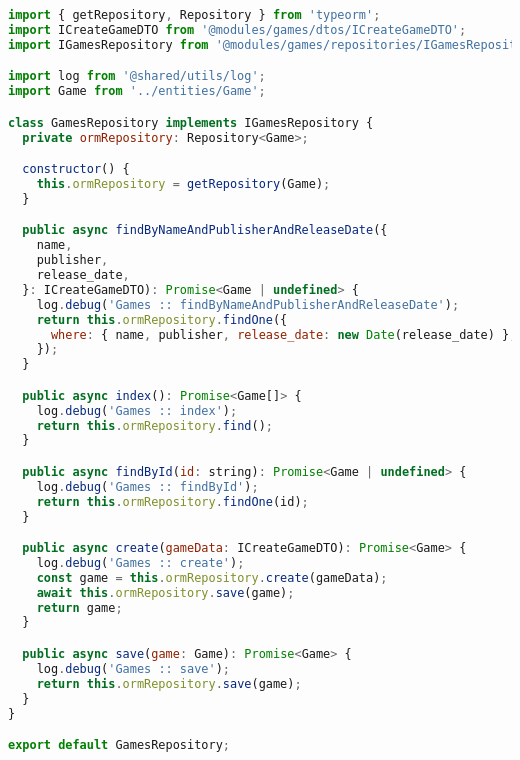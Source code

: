 \begin{lstlisting}[language=JavaScript, caption={GamesRepository.ts},captionpos=b, label=alg:gamerepository]
import { getRepository, Repository } from 'typeorm';
import ICreateGameDTO from '@modules/games/dtos/ICreateGameDTO';
import IGamesRepository from '@modules/games/repositories/IGamesRepository';

import log from '@shared/utils/log';
import Game from '../entities/Game';

class GamesRepository implements IGamesRepository {
  private ormRepository: Repository<Game>;

  constructor() {
    this.ormRepository = getRepository(Game);
  }

  public async findByNameAndPublisherAndReleaseDate({
    name,
    publisher,
    release_date,
  }: ICreateGameDTO): Promise<Game | undefined> {
    log.debug('Games :: findByNameAndPublisherAndReleaseDate');
    return this.ormRepository.findOne({
      where: { name, publisher, release_date: new Date(release_date) },
    });
  }

  public async index(): Promise<Game[]> {
    log.debug('Games :: index');
    return this.ormRepository.find();
  }

  public async findById(id: string): Promise<Game | undefined> {
    log.debug('Games :: findById');
    return this.ormRepository.findOne(id);
  }

  public async create(gameData: ICreateGameDTO): Promise<Game> {
    log.debug('Games :: create');
    const game = this.ormRepository.create(gameData);
    await this.ormRepository.save(game);
    return game;
  }

  public async save(game: Game): Promise<Game> {
    log.debug('Games :: save');
    return this.ormRepository.save(game);
  }
}

export default GamesRepository;

\end{lstlisting}